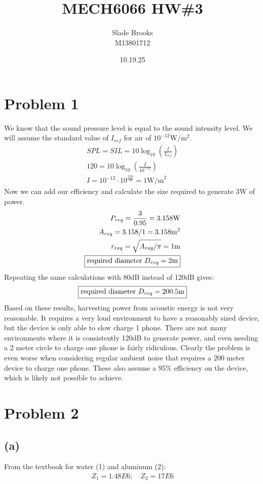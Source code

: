 \documentclass[12 pt]{article}
\title{MECH6066 HW\#3}
\date{10.19.25}
\author{Slade Brooks \\ M13801712}
\begin{document}
\maketitle

\section*{Problem 1}
We know that the sound pressure level is equal to the sound intensity level. We will assume the standard value of
$I_{ref}$ for air of $10^{-12}$W/m$^2$.
\begin{align*}
    SPL=SIL=10\log_{10}\left(\frac{I}{I_{ref}}\right) \\
    120=10\log_{10}\left(\frac{I}{10^{-12}}\right) \\
    I = 10^{-12}\cdot 10^{\frac{120}{10}}=1\text{W/m}^2
\end{align*}
Now we can add our efficiency and calculate the size required to generate 3W of power.
\begin{align*}
    P_{req}=\frac{3}{0.95}=3.158\text{W} \\
    A_{req}=3.158/1=3.158\text{m}^2 \\
    r_{req}=\sqrt{A_{req}/\pi}=1\text{m} \\
    \fbox{required diameter $D_{req}=2$m}
\end{align*}
Repeating the same calculations with 80dB instead of 120dB gives:
\begin{align*}
    \fbox{required diameter $D_{req}=200.5$m}
\end{align*}
Based on these results, harvesting power from acoustic energy is not very reasonable. It requires a very loud
environment to have a reasonably sized device, but the device is only able to slow charge 1 phone. There are not many
environments where it is consistently 120dB to generate power, and even needing a 2 meter circle to charge one phone is
fairly ridiculous. Clearly the problem is even worse when considering regular ambient noise that requires a 200 meter
device to charge one phone. These also assume a 95\% efficiency on the device, which is likely not possible to achieve.

\section*{Problem 2}
\subsection*{(a)}
From the textbook for water (1) and aluminum (2):
\begin{align*}
    Z_1 = 1.48E6; \quad Z_2 = 17E6
\end{align*}
\end{document}
